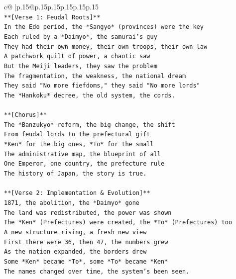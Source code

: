 \documentclass{article}
\begin{document}
{\begin{supertabular}{c@{$\;$}|p{.15\linewidth}@{}p{.15\linewidth}p{.15\linewidth}p{.15\linewidth}p{.15\linewidth}p{.15\linewidth}}
{{{\\ 
\texttt{**{[}Verse 1: Feudal Roots{]}**} \\
\texttt{In the Edo period, the *Sangyo* (provinces) were the key} \\
\texttt{Each ruled by a *Daimyo*, the samurai's guy} \\
\texttt{They had their own money, their own troops, their own law} \\
\texttt{A patchwork quilt of power, a chaotic saw} \\
\texttt{But the Meiji leaders, they saw the problem} \\
\texttt{The fragmentation, the weakness, the national dream} \\
\texttt{They said "No more fiefdoms," they said "No more lords"} \\
\texttt{The *Hankoku* decree, the old system, the cords.} \\
\\ 
\texttt{**{[}Chorus{]}**} \\
\texttt{The *Banzukyo* reform, the big change, the shift} \\
\texttt{From feudal lords to the prefectural gift} \\
\texttt{*Ken* for the big ones, *To* for the small} \\
\texttt{The administrative map, the blueprint of all} \\
\texttt{One Emperor, one country, the prefecture rule} \\
\texttt{The history of Japan, the story is true.} \\
\\ 
\texttt{**{[}Verse 2: Implementation \& Evolution{]}**} \\
\texttt{1871, the abolition, the *Daimyo* gone} \\
\texttt{The land was redistributed, the power was shown} \\
\texttt{The *Ken* (Prefectures) were created, the *To* (Prefectures) too} \\
\texttt{A new structure rising, a fresh new view} \\
\texttt{First there were 36, then 47, the numbers grew} \\
\texttt{As the nation expanded, the borders drew} \\
\texttt{Some *Ken* became *To*, some *To* became *Ken*} \\
\texttt{The names changed over time, the system's been seen.} \\
\\ 
}}}
\end{supertabular}}
\end{document}

